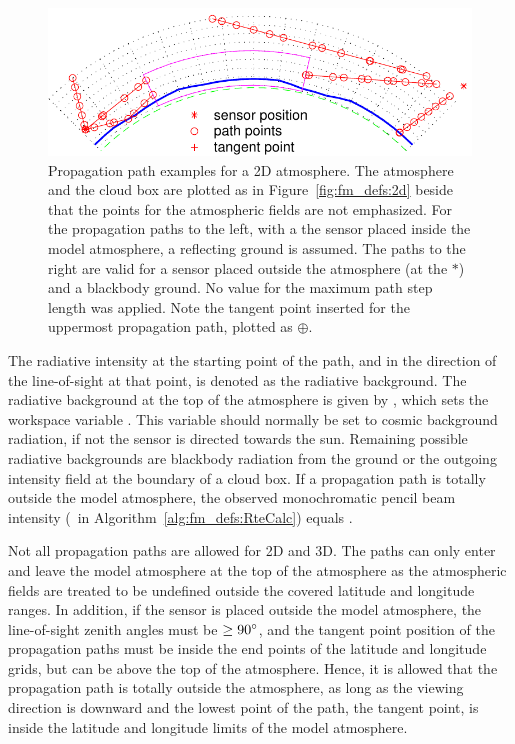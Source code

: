 \begin{figure}[!t]
 \begin{center}
  \includegraphics*[width=0.95\hsize]{Figs/fm_definitions/ppath_cases1}
  \caption{Propagation path examples for a 2D atmosphere. The atmosphere 
    and the cloud box are plotted as in Figure~\ref{fig:fm_defs:2d}
    beside that the points for the atmospheric fields are not
    emphasized. For the propagation paths to the left, with a the
    sensor placed inside the model atmosphere, a reflecting ground is
    assumed. The paths to the right are valid for a sensor placed
    outside the atmosphere (at the $*$) and a blackbody ground. No
    value for the maximum path step length was applied. Note the tangent
    point inserted for the uppermost propagation path, plotted as $\oplus$.}
  \label{fig:fm_defs:ppath_cases1}
 \end{center}
\end{figure}
 
The radiative intensity at the starting point of the path, and in the
direction of the line-of-sight at that point, is denoted as the
radiative background. The radiative background at the top of the
atmosphere is given by , which sets the
workspace variable . This
variable should normally be set to cosmic background radiation, if
not the sensor is directed towards the sun. Remaining possible
radiative backgrounds are blackbody radiation from the ground or the
outgoing intensity field at the boundary of a cloud box. If a
propagation path is totally outside the model atmosphere, the
observed monochromatic pencil beam intensity (\MpiVct\ in
Algorithm~\ref{alg:fm_defs:RteCalc}) equals .

Not all propagation paths are allowed for 2D and 3D. The paths can
only enter and leave the model atmosphere at the top of the atmosphere
as the atmospheric fields are treated to be undefined outside the
covered latitude and longitude ranges. In addition, if the sensor is
placed outside the model atmosphere, the line-of-sight zenith angles
must be $\geq90^\circ$, and the tangent point position of the
propagation paths must be inside the end points of the latitude and
longitude grids, but can be above the top of the atmosphere. Hence, it
is allowed that the propagation path is totally outside the
atmosphere, as long as the viewing direction is downward and the
lowest point of the path, the tangent point, is inside the latitude
and longitude limits of the model atmosphere.

